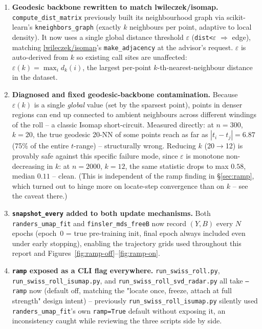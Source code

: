 \documentclass[11pt]{article}
\begin{document}
\begin{enumerate}
\item \textbf{Geodesic backbone rewritten to match lwileczek/isomap.} \texttt{compute\_dist\_matrix}
previously built its neighbourhood graph via scikit-learn's \texttt{kneighbors\_graph} (exactly $k$
neighbours per point, adaptive to local density). It now uses a single global distance threshold
$\varepsilon$ (\texttt{dist<}$\varepsilon$ $\Rightarrow$ edge), matching
\href{https://github.com/lwileczek/isomap}{lwileczek/isomap}'s \texttt{make\_adjacency} at the
advisor's request. $\varepsilon$ is auto-derived from $k$ so existing call sites are unaffected:
$\varepsilon(k)=\max_i d_k(i)$, the largest per-point $k$-th-nearest-neighbour distance in the
dataset.
\item \textbf{Diagnosed and fixed geodesic-backbone contamination.} Because $\varepsilon(k)$ is a
single \emph{global} value (set by the sparsest point), points in denser regions can end up
connected to ambient neighbours across different windings of the roll -- a classic Isomap
short-circuit. Measured directly: at $n=300$, $k=20$, the true geodesic 20-NN of some points reach
as far as $|t_i-t_j|=6.87$ (75\% of the entire $t$-range) -- structurally wrong. Reducing $k$
(20$\to$12) is provably safe against this specific failure mode, since $\varepsilon$ is monotone
non-decreasing in $k$: at $n=2000$, $k=12$, the same statistic drops to max $0.58$, median $0.11$ --
clean. (This is independent of the ramp finding in \S\ref{sec:ramp}, which turned out to hinge more
on locate-step convergence than on $k$ -- see the caveat there.)
\item \textbf{\texttt{snapshot\_every} added to both update mechanisms.} Both
\texttt{randers\_umap\_fit} and \texttt{finsler\_mds\_freeB} now record $(Y,B)$ every $N$ epochs
(epoch~0 = true pre-training init, final epoch always included even under early stopping), enabling
the trajectory grids used throughout this report and Figures~\ref{fig:ramp-off}--\ref{fig:ramp-on}.
\item \textbf{\texttt{ramp} exposed as a CLI flag everywhere.} \texttt{run\_swiss\_roll.py},
\texttt{run\_swiss\_roll\_isumap.py}, and \texttt{run\_swiss\_roll\_svd\_radar.py} all take
\texttt{--ramp} now (default off, matching the "locate once, freeze, attach at full strength"
design intent) -- previously \texttt{run\_swiss\_roll\_isumap.py} silently used
\texttt{randers\_umap\_fit}'s own \texttt{ramp=True} default without exposing it, an inconsistency
caught while reviewing the three scripts side by side.

\end{enumerate}
\end{document}
